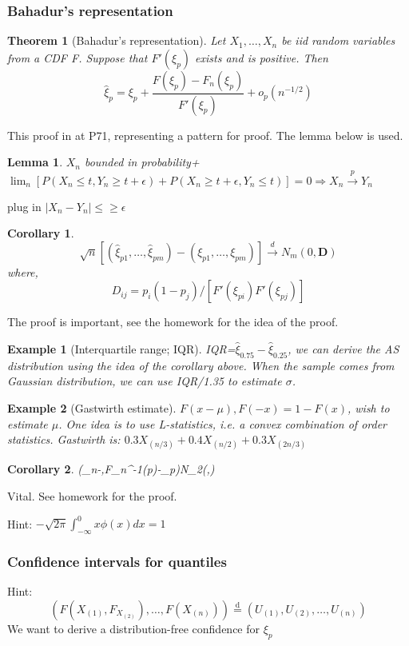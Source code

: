 \documentclass{ctexart}
\newtheorem{theorem}{Theorem}[subsection]
\newtheorem{corollary}{Corollary}[subsection]
\newtheorem{example}{Example}[subsection]
\newtheorem{lemma}{Lemma}[subsection]
\begin{document}
\subsubsection{Bahadur's representation}
\begin{theorem}[Bahadur's representation]
Let \(X_{1},\ldots,X_{n}\) be iid random variables from a CDF F. Suppose that \(F'(\xi_{p})\) exists and is positive. Then 
\[
\hat{\xi}_{p}=\xi_{p}+\frac{F(\xi_{p})-F_{n}(\xi_{p})}{F'(\xi_{p})}+o_{p}(n^{-1/2})
\]    
\end{theorem}
This proof in at P71, representing a pattern for proof. The lemma below is used.  
\begin{lemma}
  \(X_{n}\) bounded in probability+\(\lim_{n}[P(X_{n}\le t,Y_{n}\ge t+\epsilon)+P(X_{n}\ge t+\epsilon,Y_{n}\le t)]=0\Rightarrow X_{n}\xrightarrow{p}Y_{n}\)  
\end{lemma}
plug in \(|X_{n}-Y_{n}|\le\ge \epsilon\)
\begin{corollary}
  \[
  \sqrt{n}[(\hat{\xi}_{p1},\ldots,\hat{\xi}_{pm})-(\xi_{p1},\ldots,\xi_{pm})]\xrightarrow{d}N_{m}(0,\boldsymbol{D})
  \]
  where,  
  \[
  D_{ij}=p_{i}(1-p_{j})/[F'(\xi_{pi})F'(\xi_{pj})]
  \] 
\end{corollary}
The proof is important, see the homework for the idea of the proof. 
\begin{example}[Interquartile range; IQR]
  IQR=\(\hat{\xi}_{0.75}-\hat{\xi}_{0.25}\), we can derive the AS distribution using the idea of the corollary above. When the sample comes from Gaussian distribution, we can use IQR/1.35 to estimate \(\sigma\).  
\end{example}
\begin{example}[Gastwirth estimate]
  \(F(x-\mu),F(-x)=1-F(x)\), wish to estimate \(\mu\). One idea is to use L-statistics, i.e. a convex combination of order statistics. Gastwirth is: \(0.3X_{(n/3)}+0.4X_{(n/2)}+0.3X_{(2n/3)}\)   
\end{example}
\begin{corollary}
  (_{n}-\mu,F_{n}^{-1}(p)-\xi_{p})N_{2}(,\boldsymbol{\Sigma})
\end{corollary}

Vital. See homework for the proof. 

Hint: \(-\sqrt{2\pi}\int_{-\infty}^{0}x\phi(x)dx=1\) 
\subsubsection{Confidence intervals for quantiles}
Hint: \[
(F(X_{(1)},F_{X_{(2)}}),\ldots,F(X_{(n)}))\overset{\text{d}}{=}(U_{(1)},U_{(2)},\ldots,U_{(n)})
\] 
We want to derive a distribution-free confidence for \(\xi_{p}\) 
\end{document}
